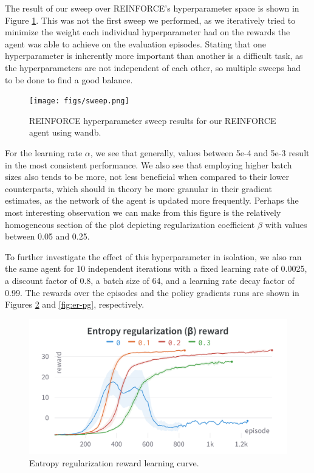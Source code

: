 \documentclass{article}
\begin{document}
The result of our sweep over REINFORCE's hyperparameter space is shown in Figure \ref{fig:sweep}.
This was not the first sweep we performed, as we iteratively tried to minimize the weight each individual hyperparameter had on the rewards the agent was able to achieve on the evaluation episodes.
Stating that one hyperparameter is inherently more important than another is a difficult task, as the hyperparameters are not independent of each other, so multiple sweeps had to be done to find a good balance.

\begin{figure}[htbp]
    \centering
    \texttt{[image: figs/sweep.png]}
    \caption{REINFORCE hyperparameter sweep results for our REINFORCE agent using wandb.}
    \label{fig:sweep}
\end{figure}

For the learning rate $\alpha$, we see that generally, values between 5e-4 and 5e-3 result in the most consistent performance.
We also see that employing higher batch sizes also tends to be more, not less beneficial when compared to their lower counterparts, which should in theory be more granular in their gradient estimates, as the network of the agent is updated more frequently.
Perhaps the most interesting observation we can make from this figure is the relatively homogeneous section of the plot depicting regularization coefficient $\beta$ with values between 0.05 and 0.25.

To further investigate the effect of this hyperparameter in isolation, we also ran the same agent for 10 independent iterations with a fixed learning rate of 0.0025, a discount factor of 0.8, a batch size of 64, and a learning rate decay factor of 0.99.
The rewards over the episodes and the policy gradients runs are shown in Figures \ref{fig:er-r} and \ref{fig:er-pg}, respectively.

\begin{figure}[htbp]
    \centering
    \includegraphics[width=\linewidth]{figs/ER-R.png}
    \caption{Entropy regularization reward learning curve.}
    \label{fig:er-r}
\end{figure}
\end{document}

